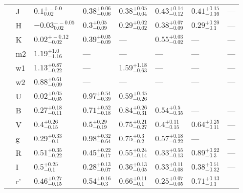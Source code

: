 \begin{longtable*}{lll|lllll}
		& J   &      $0.1_{0.02}^{+-0.0}$ &  $0.38_{-0.06}^{+0.06}$ &  $0.38_{-0.04}^{+0.05}$ &  $0.43_{-0.12}^{+0.14}$ &  $0.41_{-0.16}^{+0.15}$ &                     --- \\
		& H   &   $-0.03_{0.02}^{+-0.05}$ &   $0.3_{-0.09}^{+0.05}$ &  $0.29_{-0.02}^{+0.02}$ &  $0.38_{-0.09}^{+0.07}$ &   $0.29_{-0.1}^{+0.29}$ &                     --- \\
		& K   &   $0.02_{-0.02}^{+-0.12}$ &  $0.39_{-0.09}^{+0.05}$ &                     --- &  $0.55_{-0.02}^{+0.03}$ &                     --- &                     --- \\
		& m2  &     $1.19_{-1.16}^{+1.0}$ &                     --- &                     --- &                     --- &                     --- &                     --- \\
		& w1  &    $1.13_{-0.22}^{+0.87}$ &                     --- &  $1.59_{-0.63}^{+1.18}$ &                     --- &                     --- &                     --- \\
		& w2  &    $0.88_{-0.09}^{+0.61}$ &                     --- &                     --- &                     --- &                     --- &                     --- \\
\hline
		& U  &    $0.02_{-0.05}^{+0.05}$ &  $0.97_{-0.39}^{+0.54}$ &  $0.59_{-0.26}^{+0.45}$ &                     --- &                     --- &                     --- \\
		& B  &    $0.27_{-0.11}^{+0.18}$ &  $0.71_{-0.18}^{+0.52}$ &  $0.84_{-0.31}^{+0.26}$ &   $0.54_{-0.35}^{+0.5}$ &                     --- &                     --- \\
		& V  &     $0.4_{-0.15}^{+0.26}$ &   $0.5_{-0.19}^{+0.29}$ &  $0.75_{-0.27}^{+0.21}$ &   $0.4_{-0.15}^{+0.11}$ &  $0.64_{-0.11}^{+0.25}$ &                     --- \\
		& g  &     $0.29_{-0.1}^{+0.33}$ &  $0.98_{-0.64}^{+0.32}$ &    $0.75_{-0.2}^{+0.3}$ &  $0.57_{-0.22}^{+0.18}$ &                     --- &                     --- \\
		& R  &    $0.51_{-0.22}^{+0.35}$ &  $0.45_{-0.17}^{+0.22}$ &  $0.55_{-0.14}^{+0.24}$ &  $0.33_{-0.13}^{+0.55}$ &   $0.89_{-0.3}^{+0.22}$ &                     --- \\
		& I  &      $0.5_{-0.1}^{+0.25}$ &  $0.28_{-0.07}^{+0.13}$ &  $0.36_{-0.05}^{+0.13}$ &  $0.33_{-0.08}^{+0.11}$ &  $0.38_{-0.32}^{+0.51}$ &                     --- \\
		& r' &    $0.46_{-0.15}^{+0.27}$ &   $0.54_{-0.3}^{+0.16}$ &   $0.66_{-0.1}^{+0.11}$ &  $0.25_{-0.05}^{+0.07}$ &   $0.71_{-0.1}^{+0.13}$ &                     --- \\

\end{longtable*}
